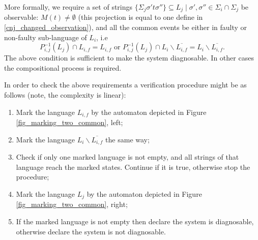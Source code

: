 \documentclass[a4paper,oneside]{article}
\begin{document}
More formally, we require a set of strings 
$\{\Sigma_j \sigma't\sigma''\} \subseteq L_j \mid \sigma', 
\sigma'' \in \Sigma_i \cap \Sigma_j$ be observable: $M(t) \neq \emptyset$
(this projection is equal to one define in \ref{cnj_changed_observation}),
and all the common events be either in faulty or non-faulty sub-language of
$L_i$, i.e 
$$
	P_{i,j}^{-1}(L_j) \cap L_{i,f} = L_{i,f} \textrm{ or } 
	P_{i,j}^{-1}(L_j) \cap L_i\backslash \overline{L_{i,f}} 
	= L_i\backslash \overline{L_{i,f}}.
$$
The above condition is sufficient to make the system diagnosable. In other cases
the compositional process is required.

In order to check the above requirements a verification procedure might be as
follows (note, the complexity is linear):
\begin{enumerate}
  \item Mark the language $L_{i,f}$ by the automaton depicted in Figure
  \ref{fig_marking_two_common}, left;
  \item Mark the language $L_i\backslash \overline{L_{i,f}}$ the same way;
  \item Check if only one marked language is not empty, and all strings of that
  language reach the marked states. Continue if it is true, otherwise stop the
  procedure;
  \item Mark the language $L_j$ by the automaton depicted in Figure
  \ref{fig_marking_two_common}, right;
  \item If the marked language is not empty then declare the system is
  diagnosable, otherwise declare the system is not diagnosable.
\end{enumerate}
\end{document}
